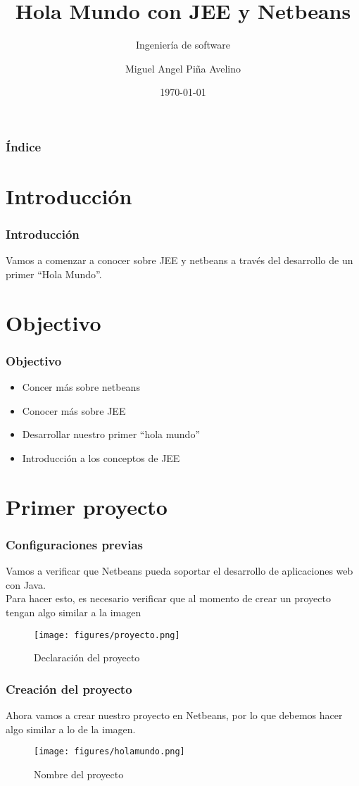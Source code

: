 \documentclass{beamer}
\title[UNAM]{Hola Mundo con JEE y Netbeans}
\subtitle{Ingeniería de software}
\author[Miguel]{Miguel Angel Piña Avelino}
\institute[UNAM]{
  Facultad de Ciencias, UNAM
}
\date{\today}
\begin{document}
\frame{\titlepage}

\begin{frame}
  \frametitle{Índice}
  \tableofcontents
\end{frame}

\section{Introducción}
\begin{frame}
  \frametitle{Introducción}
  Vamos a comenzar a conocer sobre JEE y netbeans a través del desarrollo de un
  primer ``Hola Mundo''.
\end{frame}

\section{Objectivo}

\begin{frame}
  \frametitle{Objectivo}
  \begin{itemize}
    \item Concer más sobre netbeans
    \item Conocer más sobre JEE
    \item Desarrollar nuestro primer ``hola mundo''
    \item Introducción a los conceptos de JEE
  \end{itemize}
\end{frame}

\section{Primer proyecto}

\begin{frame}
  \frametitle{Configuraciones previas}
  Vamos a verificar que Netbeans pueda soportar el desarrollo de aplicaciones
  web con Java.\\
  Para hacer esto, es necesario verificar que al momento de crear un proyecto
  tengan algo similar a la imagen
  \begin{figure}[ht]
    \centering
    \texttt{[image: figures/proyecto.png]}
    \caption{\label{fig:Proyecto} Declaración del proyecto }
  \end{figure}

\end{frame}

\begin{frame}
  \frametitle{Creación del proyecto}
  Ahora vamos a crear nuestro proyecto en Netbeans, por lo que debemos hacer
  algo similar a lo de la imagen.
  \begin{figure}[ht]
    \centering
    \texttt{[image: figures/holamundo.png]}
    \caption{\label{fig:HolaMundo} Nombre del proyecto}
  \end{figure}

\end{frame}
\end{document}
